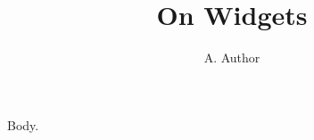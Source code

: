 \documentclass{article}
\title[Short]{On Widgets}\author{A. Author}
\begin{document}
\maketitle
Body.
\end{document}
